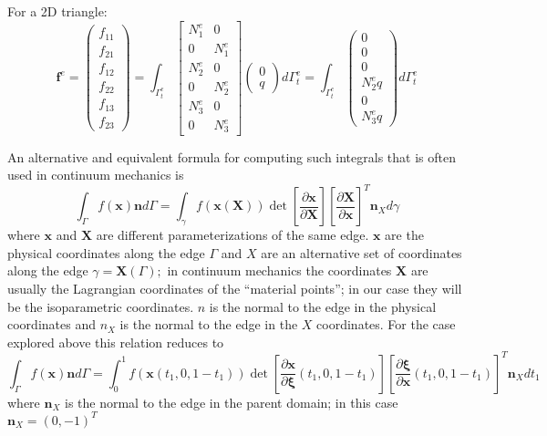 For a 2D triangle: \[\boldsymbol{f}^{e}=\left(\begin{array}{c}
f_{11} \\
f_{21} \\
f_{12} \\
f_{22} \\
f_{13} \\
f_{23}
\end{array}\right)=\int_{\Gamma_{t}^{e}}\left[\begin{array}{cc}
N_{1}^{e} & 0 \\
0 & N_{1}^{e} \\
N_{2}^{e} & 0 \\
0 & N_{2}^{e} \\
N_{3}^{e} & 0 \\
0 & N_{3}^{e}
\end{array}\right]\left(\begin{array}{l}
0 \\
q
\end{array}\right) d \Gamma_{t}^{e}=\int_{\Gamma_{t}^{e}}\left(\begin{array}{c}
0 \\
0 \\
0 \\
N_{2}^{e} q \\
0 \\
N_{3}^{e} q
\end{array}\right) d \Gamma_{t}^{e}\]

An alternative and equivalent formula for computing such integrals that
is often used in continuum mechanics is \[
\int_{\Gamma} f(\boldsymbol{x}) \boldsymbol{n} d \Gamma=\int_{\gamma} f(\boldsymbol{x}(\boldsymbol{X})) \operatorname{det}\left[\frac{\partial \boldsymbol{x}}{\partial \boldsymbol{X}}\right]\left[\frac{\partial \boldsymbol{X}}{\partial \boldsymbol{x}}\right]^{T} \boldsymbol{n}_{X} d \gamma
\] where \(\boldsymbol{x}\) and \(\boldsymbol{X}\) are different
parameterizations of the same edge. \(\boldsymbol{x}\) are the physical
coordinates along the edge \(\Gamma\) and \(X\) are an alternative set
of coordinates along the edge \(\gamma=\boldsymbol{X}(\Gamma) ;\) in
continuum mechanics the coordinates \(\boldsymbol{X}\) are usually the
Lagrangian coordinates of the ``material points''; in our case they will
be the isoparametric coordinates. \(n\) is the normal to the edge in the
physical coordinates and \(n_{X}\) is the normal to the edge in the
\(X\) coordinates. For the case explored above this relation reduces to
\[
\int_{\Gamma} f(\boldsymbol{x}) \boldsymbol{n} d \Gamma=\int_{0}^{1} f\left(\boldsymbol{x}\left(t_{1}, 0,1-t_{1}\right)\right) \operatorname{det}\left[\frac{\partial \boldsymbol{x}}{\partial \boldsymbol{\xi}}\left(t_{1}, 0,1-t_{1}\right)\right]\left[\frac{\partial \boldsymbol{\xi}}{\partial \boldsymbol{x}}\left(t_{1}, 0,1-t_{1}\right)\right]^{T} \boldsymbol{n}_{X} d t_{1}
\] where \(\boldsymbol{n}_{X}\) is the normal to the edge in the parent
domain; in this case \(\boldsymbol{n}_{X}=(0,-1)^{T}\)

